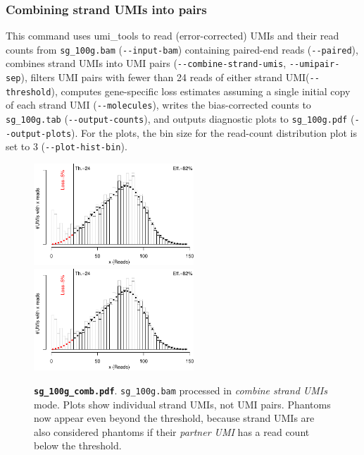 \documentclass[10pt]{article}
\newcommand{\shellscript}[1]{\bgroup\topsep=0pt\partopsep=0pt\shaded%
	\endshaded\egroup}
\newcommand{\ddarg}[1]{\texttt{-{}-#1}}
\begin{document}
\newpage
\subsubsection*{Combining strand UMIs into pairs}

\shellscript{../examples/sg_100g_comb.cmd}

\begin{sloppypar}
This command uses umi\_tools to read (error-corrected) UMIs and their read counts from \texttt{sg\_100g.bam} (\ddarg{input-bam}) containing paired-end reads (\ddarg{paired}), combines strand UMIs into UMI pairs (\ddarg{combine-strand-umis}, \ddarg{umipair-sep}), filters UMI pairs with fewer than 24 reads of either strand UMI(\ddarg{threshold}), computes gene-specific loss estimates assuming a single initial copy of each strand UMI (\ddarg{molecules}), writes the bias-corrected counts to \texttt{sg\_100g.tab} (\ddarg{output-counts}), and outputs diagnostic plots to \texttt{sg\_100g.pdf} (\ddarg{output-plots}). For the plots, the bin size for the read-count distribution plot is set to 3 (\ddarg{plot-hist-bin}).
\end{sloppypar}

\begin{figure}[H]
{\centering
\includegraphics[width=6cm,page=1]{../examples/sg_100g_comb.pdf}
\includegraphics[width=6cm,page=2]{../examples/sg_100g_comb.pdf}
\\}
\caption*{\textbf{\texttt{sg\_100g\_comb.pdf}}. \texttt{sg\_100g.bam} processed in \emph{combine strand UMIs} mode. Plots show individual strand UMIs, not UMI pairs. Phantoms now appear even beyond the threshold, because strand UMIs are also considered phantoms if their \emph{partner UMI} has a read count below the threshold.}
\end{figure}
\end{document}
